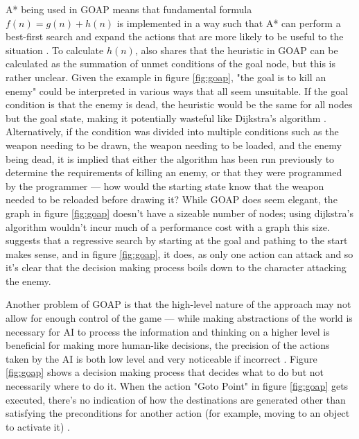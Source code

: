 \documentclass[11pt, a4paper]{article}
\begin{document}
A* being used in GOAP means that fundamental formula $f(n) = g(n) + h(n)$ \parencite[102]{hart1968formal} is implemented in a way such that A* can perform a best-first search and expand the actions that are more likely to be  useful to the situation \parencite[7]{orkin2003applying}. To calculate $h(n)$, \citeauthor{orkin2003applying} \parencite*[7]{orkin2003applying} also shares that the heuristic in GOAP can be calculated as the summation of unmet conditions of the goal node, but this is rather unclear. Given the example in figure \ref{fig:goap}, "the goal is to kill an enemy" \parencite[3]{orkin2003applying} could be interpreted in various ways that all seem unsuitable. If the goal condition is that the enemy is dead, the heuristic would be the same for all nodes but the goal state, making it potentially wasteful like Dijkstra's algorithm \parencite[214]{millington2019ai}. Alternatively, if the condition was divided into multiple conditions such as the weapon needing to be drawn, the weapon needing to be loaded, and the enemy being dead, it is implied that either the algorithm has been run previously to determine the requirements of killing an enemy, or that they were programmed by the programmer --- how would the starting state know that the weapon needed to be reloaded before drawing it? While GOAP does seem elegant, the graph in figure \ref{fig:goap} doesn't have a sizeable number of nodes; using dijkstra's algorithm wouldn't incur much of a performance cost with a graph this size. \citeauthor{orkin2003applying} \parencite*{orkin2003applying} suggests that a regressive search by starting at the goal and pathing to the start makes sense, and in figure \ref{fig:goap}, it does, as only one action can attack and so it's clear that the decision making process boils down to the character attacking the enemy.

Another problem of GOAP is that the high-level nature of the approach may not allow for enough control of the game \parencite[87]{stanciu2012implementing} --- while making abstractions of the world is necessary for AI to process the information \parencite[2]{buro2004call} and thinking on a higher level is beneficial for making more human-like decisions, the precision of the actions taken by the AI is both low level and very noticeable if incorrect \parencite[60]{graham2003pathfinding}. Figure \ref{fig:goap} shows a decision making process that decides what to do but not necessarily where to do it. When the action "Goto Point" in figure \ref{fig:goap} gets executed, there's no indication of how the destinations are generated other than satisfying the preconditions for another action (for example, moving to an object to activate it) \parencite[7]{orkin2003applying}. 
\end{document}
